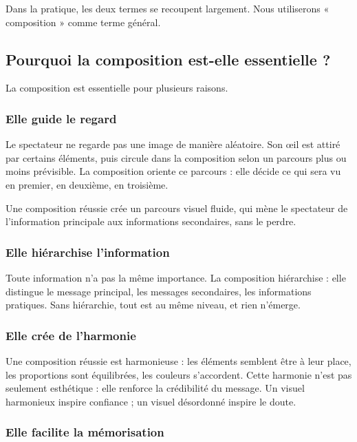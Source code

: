 Dans la pratique, les deux termes se recoupent largement. Nous utiliserons « composition » comme terme général.

\subsection{Pourquoi la composition est-elle essentielle ?}

La composition est essentielle pour plusieurs raisons.

\subsubsection{Elle guide le regard}

Le spectateur ne regarde pas une image de manière aléatoire. Son œil est attiré par certains éléments, puis circule dans la composition selon un parcours plus ou moins prévisible. La composition oriente ce parcours : elle décide ce qui sera vu en premier, en deuxième, en troisième.

Une composition réussie crée un parcours visuel fluide, qui mène le spectateur de l'information principale aux informations secondaires, sans le perdre.

\subsubsection{Elle hiérarchise l'information}

Toute information n'a pas la même importance. La composition hiérarchise : elle distingue le message principal, les messages secondaires, les informations pratiques. Sans hiérarchie, tout est au même niveau, et rien n'émerge.

\subsubsection{Elle crée de l'harmonie}

Une composition réussie est harmonieuse : les éléments semblent être à leur place, les proportions sont équilibrées, les couleurs s'accordent. Cette harmonie n'est pas seulement esthétique : elle renforce la crédibilité du message. Un visuel harmonieux inspire confiance ; un visuel désordonné inspire le doute.

\subsubsection{Elle facilite la mémorisation}

